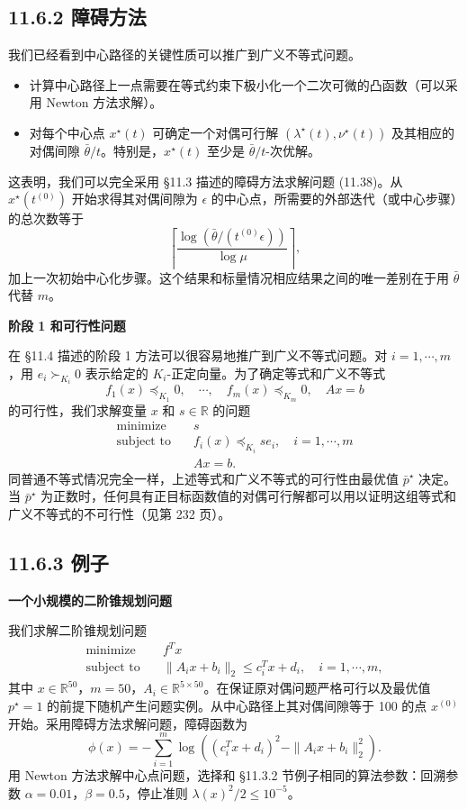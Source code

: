 \documentclass[UTF8, 12pt, fontset=fandol, oneside]{ctexart}
\begin{document}
\subsection*{11.6.2 障碍方法}

我们已经看到中心路径的关键性质可以推广到广义不等式问题。
\begin{itemize}
\item 计算中心路径上一点需要在等式约束下极小化一个二次可微的凸函数（可以采用 Newton 方法求解）。
\item 对每个中心点 $x^\star(t)$ 可确定一个对偶可行解 $(\lambda^\star(t),\nu^\star(t))$ 及其相应的对偶间隙 $\bar{\theta}/t$。特别是，$x^\star(t)$ 至少是 $\bar{\theta}/t$-次优解。
\end{itemize}
这表明，我们可以完全采用 \S 11.3 描述的障碍方法求解问题 (11.38)。从 $x^\star(t^{(0)})$ 开始求得其对偶间隙为 $\epsilon$ 的中心点，所需要的外部迭代（或中心步骤）的总次数等于
\[
\left\lceil\frac{\log(\bar{\theta}/(t^{(0)}\epsilon))}{\log\mu}\right\rceil,
\]
加上一次初始中心化步骤。这个结果和标量情况相应结果之间的唯一差别在于用 $\bar{\theta}$ 代替 $m$。

\noindent\textbf{阶段 1 和可行性问题}

在 \S 11.4 描述的阶段 1 方法可以很容易地推广到广义不等式问题。对 $i=1,\cdots,m$，用 $e_i\succ_{K_i}0$ 表示给定的 $K_i$-正定向量。为了确定等式和广义不等式
\[
f_1(x)\preceq_{K_1}0,\quad \cdots,\quad f_m(x)\preceq_{K_m}0,\quad Ax=b
\]
的可行性，我们求解变量 $x$ 和 $s\in\mathbb{R}$ 的问题
\[
\begin{aligned}
\text{minimize}\quad & s\\
\text{subject to}\quad & f_i(x)\preceq_{K_i}se_i,\quad i=1,\cdots,m\\
& Ax=b.
\end{aligned}
\]
同普通不等式情况完全一样，上述等式和广义不等式的可行性由最优值 $\bar{p}^\star$ 决定。当 $\bar{p}^\star$ 为正数时，任何具有正目标函数值的对偶可行解都可以用以证明这组等式和广义不等式的不可行性（见第 232 页）。

\subsection*{11.6.3 例子}

\noindent\textbf{一个小规模的二阶锥规划问题}

我们求解二阶锥规划问题
\[
\begin{aligned}
\text{minimize}\quad & f^Tx\\
\text{subject to}\quad & \|A_ix+b_i\|_2\leq c_i^Tx+d_i,\quad i=1,\cdots,m,
\end{aligned}
\]
其中 $x\in\mathbb{R}^{50}$，$m=50$，$A_i\in\mathbb{R}^{5\times 50}$。在保证原对偶问题严格可行以及最优值 $p^\star=1$ 的前提下随机产生问题实例。从中心路径上其对偶间隙等于 100 的点 $x^{(0)}$ 开始。采用障碍方法求解问题，障碍函数为
\[
\phi(x)=-\sum_{i=1}^m\log\left((c_i^Tx+d_i)^2-\|A_ix+b_i\|_2^2\right).
\]
用 Newton 方法求解中心点问题，选择和 \S 11.3.2 节例子相同的算法参数：回溯参数 $\alpha=0.01$，$\beta=0.5$，停止准则 $\lambda(x)^2/2\leq 10^{-5}$。
\end{document}
